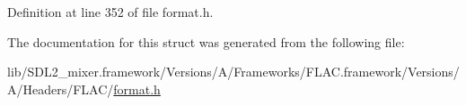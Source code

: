 Definition at line 352 of file format.\+h.



The documentation for this struct was generated from the following file\+:\begin{DoxyCompactItemize}
\item 
lib/\+S\+D\+L2\+\_\+mixer.\+framework/\+Versions/\+A/\+Frameworks/\+F\+L\+A\+C.\+framework/\+Versions/\+A/\+Headers/\+F\+L\+A\+C/\mbox{\hyperlink{format_8h}{format.\+h}}\end{DoxyCompactItemize}
